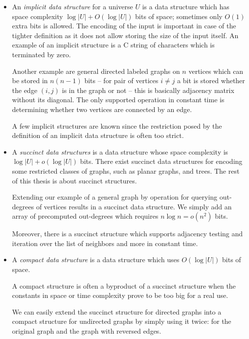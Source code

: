 \begin{itemize}
	\item An \emph{implicit data structure} for a universe $U$ is a data structure which has space complexity $ \log |U| + O(\log |U|) $ bits of space; sometimes only $O(1)$ extra bits is allowed.
	The encoding of the input is important in case of the tighter definition as it does not allow storing the size of the input itself.
	An example of an implicit structure is a C string of characters which is terminated by zero.
	
	Another example\label{ex:implicit-graph} are general directed labeled graphs on $n$ vertices which can be stored in $n (n - 1)$ bits -- for pair of vertices $i \ne j$ a bit is stored whether the edge $(i, j)$ is in the graph or not -- this is basically adjacency matrix without its diagonal.
	The only supported operation in constant time is determining whether two vertices are connected by an edge.
	
	A few implicit structures are known since the restriction posed by the definition of an implicit data structure is often too strict.

	\item A \emph{succinct data structures} is a data structure whose space complexity is $ \log |U| + o(\log |U|) $ bits.
	There exist succinct data structures for encoding some restricted classes of graphs, such as planar graphs, and trees.
	The rest of this thesis is about succinct structures.
	
	Extending our example of a general graph by operation for querying out-degrees of vertices results in a succinct data structure.
	We simply add an array of precomputed out-degrees which requires $n \log n = o(n^2)$ bits.
	
	Moreover, there is a succinct structure which supports adjacency testing and iteration over the list of neighbors and more in constant time. \cite[Theorem~6.1]{raman2007succinct}
	
	\item A \emph{compact data structure} is a data structure which uses $ O(\log |U|) $ bits of space.
	
	A compact structure is often a byproduct of a succinct structure when the constants in space or time complexity prove to be too big for a real use. \cite{gonzalez2005practical}
	
	We can easily extend the succinct structure for directed graphs into a compact structure for undirected graphs by simply using it twice: for the original graph and the graph with reversed edges.
\end{itemize}

